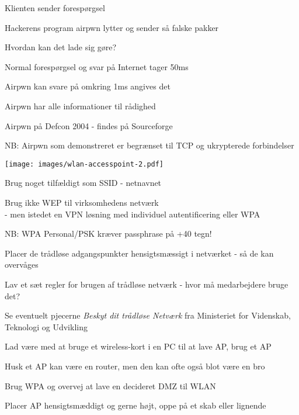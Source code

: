 \documentclass[Screen16to9,17pt]{foils}
\begin{document}
\begin{list1}
\item Klienten sender forespørgsel
\item Hackerens program airpwn lytter og sender så falske pakker
\item Hvordan kan det lade sig gøre?
\begin{list2}
\item Normal forespørgsel og svar på Internet tager 50ms
\item Airpwn kan svare på omkring 1ms angives det
\item Airpwn har alle informationer til rådighed
\end{list2}
\item Airpwn på Defcon 2004 - findes på Sourceforge\\
\item NB: Airpwn som demonstreret er begrænset til TCP og ukrypterede
  forbindelser
\end{list1}



\begin{minipage}{10cm}
\texttt{[image: images/wlan-accesspoint-2.pdf]}
\end{minipage}
\begin{minipage}{\linewidth-10cm}
\begin{list2}
\item Brug noget tilfældigt som SSID - netnavnet
\item Brug ikke WEP til virksomhedens netværk\\
- men istedet en VPN løsning med individuel
  autentificering eller WPA
\item NB: WPA Personal/PSK kræver passphrase på +40 tegn!
\item Placer de trådløse adgangspunkter hensigtsmæssigt i netværket -
  så de kan overvåges
\item Lav et sæt regler for brugen af trådløse netværk - hvor må
  medarbejdere bruge det?
\item Se eventuelt pjecerne \emph{Beskyt dit trådløse Netværk} fra
Ministeriet for Videnskab, Teknologi og Udvikling \\
\end{list2}
\end{minipage}



\begin{list1}
\item Lad være med at bruge et wireless-kort i en PC til at lave AP, brug et AP
\item Husk et AP kan være en router, men den kan ofte også blot være en bro
\item Brug WPA og overvej at lave en decideret DMZ til WLAN
\item Placer AP hensigtsmæddigt og gerne højt, oppe på et skab eller lignende
\end{list1}



\slidenext
\end{document}
